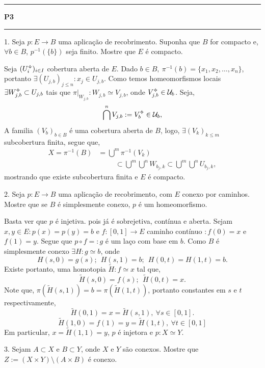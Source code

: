   {\hrule \vspace{-0.15cm}
  \centering \textbf{P3} \vspace{0.1cm}
  \hrule}

1. Seja \(p : E \to B \) uma aplicação de recobrimento. Suponha que \(B\) for compacto e, \(\forall b\in B\), \(p^{-1}(\{b\})\) seja finito. Mostre que \(E\) é compacto. 

\textcolor{gris}{Seja \((U_i\ab)_{i \in I}\) cobertura aberta de \(E\). Dado \(b \in B, \ \pi^{-1}(b) = \{x_1, x_2, \ldots, x_n\}\), portanto \(\exists (U_{j,b})_{j\leq n} : x_j \in U_{j,b}\). Como temos homeomorfismos locais \(\exists W_{j,b}\ab \subset U_{j,b} \) tais que \(\pi|_{W_{j,b}}: W_{j,b} \simeq V_{j,b}\), onde \(V_{j,b}\ab \in \U_b\). Seja, 
\[\bigcap^n V_{j,b} := V_b\ab \in \U_b, \]
A familia \((V_b)_{b\in B}\) é uma cobertura aberta de \(B\), logo, \(\exists (V_k)_{k\leq m}\) subcobertura finita, segue que,  
\begin{align*}
X = \pi^{-1}(B) &= \bigcup^m\pi^{-1}(V_k)  \\ 
&\hspace{1cm}\subset \bigcup^m\bigcup^n W_{b_j,k} \subset \bigcup^m\bigcup^n U_{b_j,k},
\end{align*}
mostrando que existe subcobertura finita e \(E\) é compacto. 
}

2. Seja \(p : E \to B\) uma aplicação de recobrimento, com \(E\) conexo por caminhos. Mostre que se \(B\) é simplesmente conexo, \(p\) é um homeomorfismo.  

\textcolor{gris}{Basta ver que \(p\) é injetiva. pois já é sobrejetiva, contínua e aberta. Sejam \(x, y\in E: p(x) = p(y) = b\) e \(f : [0,1] \to E\) caminho contínuo \(: f(0) =x\) e \(f(1)= y\). Segue que \(p \circ f=:g \) é um laço com base em \(b\). Como \(B\) é simplesmente conexo \(\exists H:  g \simeq b\), onde 
\[H(s,0) = g(s); \ \ H(s,1) = b; \ \ H(0,t) = H(1,t) = b.\]
Existe portanto, uma homotopia \(\widetilde{H}:f \simeq x \) tal que, 
\[\widetilde{H}(s,0) = f(s); \ \  \widetilde{H}(0,t) = x.\]
Note que, \(\pi(\widetilde{H}(s,1))= b = \pi(\widetilde{H}(1,t))\), portanto constantes em \( s\) e \( t\) respectivamente,    
\[\widetilde{H}(0,1) = x =  \widetilde{H}(s,1), \ \forall s \in [0,1].\]
\[\widetilde{H}(1,0) = f(1) = y= \widetilde{H}(1,t), \  \forall t \in [0,1]\]
Em particular,  \(x =\widetilde{H}(1,1) = y \), \(p \) é injetora e \(p : X \simeq Y\).  
}

3. Sejam \(A\subset X\) e \(B\subset Y\), onde \(X\) e \(Y\) são conexos. Mostre que \(Z:= (X\times Y) \setminus (A\times B)\) é conexo.  

